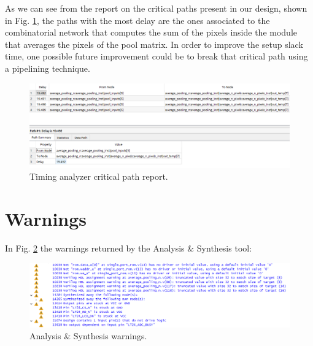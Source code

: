 \documentclass[11pt]{report}
\begin{document}
As we can see from the report on the critical paths present in our design, shown in Fig. \ref{fig:report_path}, the paths with the most delay are the ones associated to the combinatorial network that computes the sum of the pixels inside the module that averages the pixels of the pool matrix. In order to improve the setup slack time, one possible future improvement could be to break that critical path using a pipelining technique.

\begin{figure}[!h]
    \centering
    \includegraphics[width=1\linewidth]{images/fpga_implementation/report_path.png}
    \caption{Timing analyzer critical path report.}
    \label{fig:report_path}
\end{figure}

\section{Warnings}
In Fig. \ref{fig:analysis_synth_warnings} the warnings returned by the Analysis \& Synthesis tool:

\begin{figure}[!h]
    \centering
    \includegraphics[width=1\linewidth]{images/fpga_implementation/warnings_synth.png}
    \caption{Analysis \& Synthesis warnings.}
    \label{fig:analysis_synth_warnings}
\end{figure}
\end{document}
